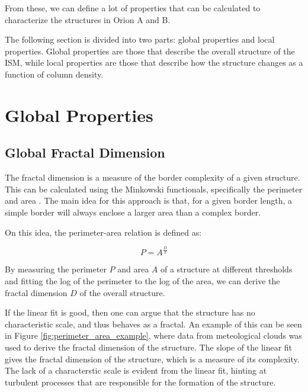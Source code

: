 From these, we can define a lot of properties that can be calculated to characterize the structures in Orion A and B. 

The following section is divided into two parts: global properties and local properties. Global properties are those that describe the overall structure of the ISM, while local properties are those that describe how the structure changes as a function of column density.

\section{Global Properties}

\subsection{Global Fractal Dimension}

The fractal dimension is a measure of the border complexity of a given structure. This can be calculated using the Minkowski functionals, specifically the perimeter and area \cite{cannon1984fractal}. 
The main idea for this approach is that, for a given border length, a simple border will always enclose a larger area than a complex border.

On this idea, the perimeter-area relation is defined as:

\begin{equation}
    \label{eq:perimeter_area}
    P = A^{\frac{D}{2}}
\end{equation}

By measuring the perimeter $P$ and area $A$ of a structure at different thresholds and fitting the log of the perimeter to the log of the area, we can derive the fractal dimension $D$ of the overall structure. 

If the linear fit is good, then one can argue that the structure has no characteristic scale, and thus behaves as a fractal. An example of this can be seen in Figure \ref{fig:perimeter_area_example}, where data from meteological clouds was used to derive the fractal dimension of the structure. The slope of the linear fit gives the fractal dimension of the structure, which is a measure of its complexity. The lack of a characterstic scale is evident from the linear fit, hinting at turbulent processes that are responsible for the formation of the structure.

